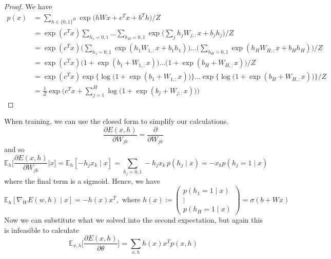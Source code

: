     \begin{proof}
      We have 
      \begin{align} 
        p(x) & = \sum_{h \in \{0, 1\}^H} \exp \big( h W x + c^T x + b^T h\big) /Z \\
                      & = \exp (c^T x) \sum_{h_1 = 0, 1} \ldots \sum_{h_H = 0, 1} \exp \bigg( \sum_j h_j W_{j, :} x + b_j h_j \bigg) / Z \\
                      & = \exp (c^T x) \bigg( \sum_{h_1 = 0, 1} \exp (h_1 W_{1, :} x + b_1 h_1 ) \bigg) \ldots \bigg( \sum_{h_H = 0, 1} \exp (h_H W_{H, :} x + b_H h_H) \bigg) / Z \\
                      & = \exp (c^T x) \big( 1 + \exp (b_1 + W_{1, :} x) \big) \ldots \big( 1 + \exp (b_H + W_{H, :} x)\big) / Z \\
                      & = \exp (c^T x) \exp\big\{ \log \big( 1 + \exp (b_1 + W_{1, :} x) \big) \big\} \ldots \exp \big\{ \log \big( 1 + \exp (b_H + W_{H, :} x) \big) \big\} / Z \\
                      & = \frac{1}{Z} \exp \bigg( c^T x + \sum_{j=1}^H \log \big( 1 + \exp (b_j + W_{j, :} x) \big) \bigg) 
      \end{align} 
    \end{proof}

    When training, we can use the closed form to simplify our calculations. 
    \begin{equation}
      \frac{\partial E(x, h)}{\partial W_{j k}} = \frac{\partial}{\partial W_{j k}} 
    \end{equation}
    and so 
    \begin{equation}
      \mathbb{E}_{h} \bigg[ \frac{\partial E(x, h)}{\partial W_{j k}} \bigg| x \bigg] = \mathbb{E}_{h} [ -h_j x_k \mid x] = \sum_{h_j = 0, 1} - h_j x_k \, p(h_j \mid x) = - x_k p(h_j = 1 \mid x)
    \end{equation}
    where the final term is a sigmoid. Hence, we have 
    \begin{equation}
      \mathbb{E}_{h} [ \nabla_{W} E(w, h) \mid x] = - h(x) x^T, \text{ where } h(x) \coloneqq \begin{pmatrix} p(h_1 = 1 \mid x) \\ \vdots \\ p(h_H = 1 \mid x) \end{pmatrix} = \sigma(b + W x)
    \end{equation}
    Now we can substitute what we solved into the second expectation, but again this is infeasible to calculate 
    \begin{equation}
      \mathbb{E}_{x, h} \bigg[ \frac{\partial E(x, h)}{\partial\theta}\bigg] = \sum_{x, h} h(x) x^T p(x, h)
    \end{equation}


